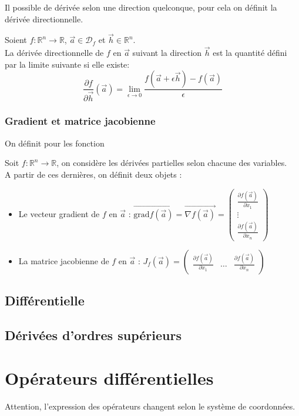 Il possible de dérivée selon une direction quelconque, pour cela on définit la dérivée directionnelle.
\begin{defi}
    Soient $f:\mathbb{R}^n\to\mathbb{R}$, $\overrightarrow{a}\in\mathscr{D}_f$ et $\overrightarrow{h}\in\mathbb{R}^n$.\\
    La dérivée directionnelle de $f$ en $\overrightarrow{a}$ suivant la direction $\overrightarrow{h}$ est la quantité défini par la limite suivante si elle existe:
    $$\frac{\partial f}{\partial\overrightarrow{h}}(\overrightarrow{a})=\lim_{\epsilon\to 0}\frac{f(\overrightarrow{a}+\epsilon\overrightarrow{h})-f(\overrightarrow{a})}{\epsilon}$$ 
\end{defi}
\subsection{Gradient et matrice jacobienne}
On définit pour les fonction
\begin{defi}
Soit $f:\mathbb{R}^n\to\mathbb{R}$, on considère les dérivées partielles selon chacune des variables.\\
A partir de ces dernières, on définit deux objets :
\begin{itemize}
    \item Le vecteur gradient de $f$ en $\overrightarrow{a}$ : $\overrightarrow{\text{grad}f(\overrightarrow{a})}=\overrightarrow{\nabla f(\overrightarrow{a})}=\begin{pmatrix}\frac{\partial f(\overrightarrow{a})}{\partial x_1}\\\vdots\\\frac{\partial f(\overrightarrow{a})}{\partial x_n}\end{pmatrix}$
    \item La matrice jacobienne de $f$ en $\overrightarrow{a}$ : $J_f(\overrightarrow{a})=\begin{pmatrix}\frac{\partial f(\overrightarrow{a})}{\partial x_1}&\hdots&\frac{\partial f(\overrightarrow{a})}{\partial x_n}\end{pmatrix}$
\end{itemize}
\end{defi}
\section{Différentielle}
\section{Dérivées d'ordres supérieurs}
\chapter{Opérateurs différentielles}
Attention, l'expression des opérateurs changent selon le système de coordonnées.
